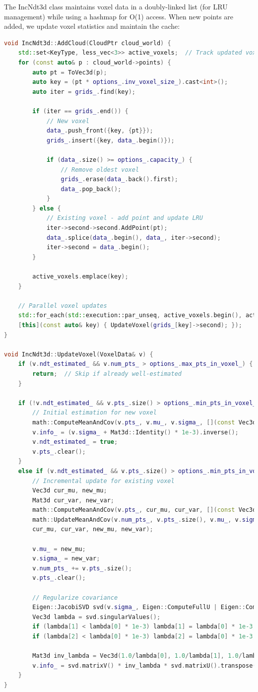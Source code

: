 The IncNdt3d class maintains voxel data in a doubly-linked list (for LRU management) while using a hashmap for O(1) access. When new points are added, we update voxel statistics and maintain the cache:

\begin{lstlisting}[language=c++,caption=src/ch7/ndt\_inc.cc]
void IncNdt3d::AddCloud(CloudPtr cloud_world) {
	std::set<KeyType, less_vec<3>> active_voxels;  // Track updated voxels
	for (const auto& p : cloud_world->points) {
		auto pt = ToVec3d(p);
		auto key = (pt * options_.inv_voxel_size_).cast<int>();
		auto iter = grids_.find(key);
		
		if (iter == grids_.end()) {
			// New voxel
			data_.push_front({key, {pt}});
			grids_.insert({key, data_.begin()});
			
			if (data_.size() >= options_.capacity_) {
				// Remove oldest voxel
				grids_.erase(data_.back().first);
				data_.pop_back();
			}
		} else {
			// Existing voxel - add point and update LRU
			iter->second->second.AddPoint(pt);
			data_.splice(data_.begin(), data_, iter->second);
			iter->second = data_.begin();
		}
		
		active_voxels.emplace(key);
	}
	
	// Parallel voxel updates
	std::for_each(std::execution::par_unseq, active_voxels.begin(), active_voxels.end(),
	[this](const auto& key) { UpdateVoxel(grids_[key]->second); });
}

void IncNdt3d::UpdateVoxel(VoxelData& v) {
	if (v.ndt_estimated_ && v.num_pts_ > options_.max_pts_in_voxel_) {
		return;  // Skip if already well-estimated
	}
	
	if (!v.ndt_estimated_ && v.pts_.size() > options_.min_pts_in_voxel_) {
		// Initial estimation for new voxel
		math::ComputeMeanAndCov(v.pts_, v.mu_, v.sigma_, [](const Vec3d& p) { return p; });
		v.info_ = (v.sigma_ + Mat3d::Identity() * 1e-3).inverse();
		v.ndt_estimated_ = true;
		v.pts_.clear();
	} 
	else if (v.ndt_estimated_ && v.pts_.size() > options_.min_pts_in_voxel_) {
		// Incremental update for existing voxel
		Vec3d cur_mu, new_mu;
		Mat3d cur_var, new_var;
		math::ComputeMeanAndCov(v.pts_, cur_mu, cur_var, [](const Vec3d& p) { return p; });
		math::UpdateMeanAndCov(v.num_pts_, v.pts_.size(), v.mu_, v.sigma_, 
		cur_mu, cur_var, new_mu, new_var);
		
		v.mu_ = new_mu;
		v.sigma_ = new_var;
		v.num_pts_ += v.pts_.size();
		v.pts_.clear();
		
		// Regularize covariance
		Eigen::JacobiSVD svd(v.sigma_, Eigen::ComputeFullU | Eigen::ComputeFullV);
		Vec3d lambda = svd.singularValues();
		if (lambda[1] < lambda[0] * 1e-3) lambda[1] = lambda[0] * 1e-3;
		if (lambda[2] < lambda[0] * 1e-3) lambda[2] = lambda[0] * 1e-3;
		
		Mat3d inv_lambda = Vec3d(1.0/lambda[0], 1.0/lambda[1], 1.0/lambda[2]).asDiagonal();
		v.info_ = svd.matrixV() * inv_lambda * svd.matrixU().transpose();
	}
}
\end{lstlisting}

